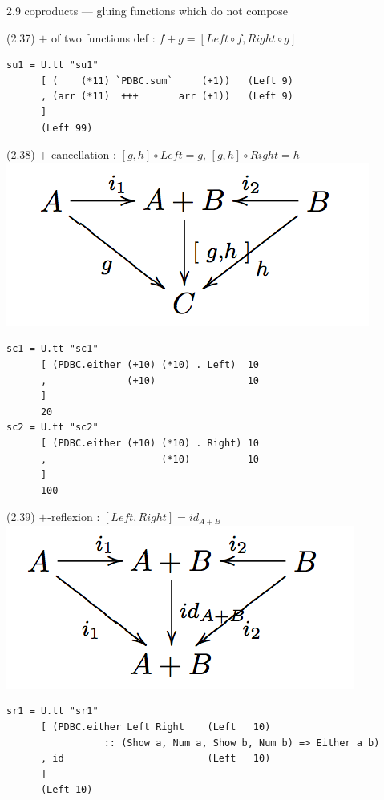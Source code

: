 \documentclass[presentation]{beamer}
\begin{document}
\begin{frame}[fragile,label=sec-8]{2.9 coproducts --- gluing functions which do not compose}
\begin{block}{(2.37) $+$ of two functions def : $f + g = [Left \circ f, Right \circ g]$}
\begin{verbatim}
su1 = U.tt "su1"
      [ (    (*11) `PDBC.sum`     (+1))   (Left 9)
      , (arr (*11)  +++       arr (+1))   (Left 9)
      ]
      (Left 99)
\end{verbatim}
\end{block}

\begin{block}{(2.38) $+$-cancellation : $[g,h] \circ Left = g$, $[g,h] \circ Right = h$}
\includegraphics[width=.9\linewidth]{./sum-cancellation.png}

\begin{verbatim}
sc1 = U.tt "sc1"
      [ (PDBC.either (+10) (*10) . Left)  10
      ,              (+10)                10
      ]
      20
sc2 = U.tt "sc2"
      [ (PDBC.either (+10) (*10) . Right) 10
      ,                    (*10)          10
      ]
      100
\end{verbatim}
\end{block}

\begin{block}{(2.39) $+$-reflexion : $[ Left, Right ] = id_{A + B}$}
\includegraphics[width=.9\linewidth]{./sum-reflexion.png}

\begin{verbatim}
sr1 = U.tt "sr1"
      [ (PDBC.either Left Right    (Left   10)
                 :: (Show a, Num a, Show b, Num b) => Either a b)
      , id                         (Left   10)
      ]
      (Left 10)


\end{verbatim}
\end{block}
\end{frame}
\end{document}
